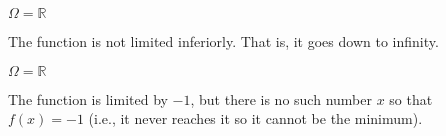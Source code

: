 \begin{minipage}{0.33\linewidth}
    \centering
    \begin{center}
        \( \Omega = \mathbb{R} \)

        \begin{adjustwidth}{0.05\linewidth}{0.05\linewidth}
            The function is not limited inferiorly. That is, it goes down to infinity.
        \end{adjustwidth}
    \end{center}
\end{minipage}
\begin{minipage}{0.33\linewidth}
    \centering
    \begin{center}
        \( \Omega = \mathbb{R} \)

        \begin{adjustwidth}{0.05\linewidth}{0.05\linewidth}
            The function is limited by \( -1 \), but there is no such number \( x \) so that \( f(x) = -1 \)  (i.e., it never reaches it so it cannot be the minimum).
        \end{adjustwidth}
    \end{center}
\end{minipage}
